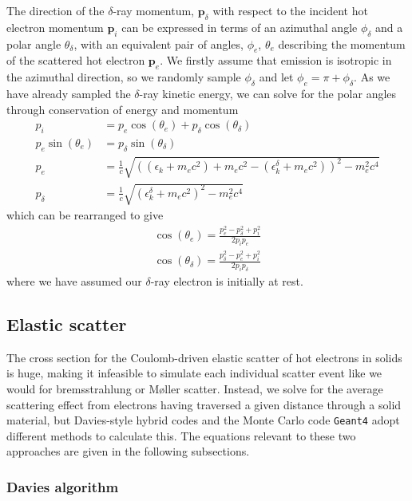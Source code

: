 \documentclass[12pt]{article}
\numberwithin{equation}{section}
\begin{document}
The direction of the $\delta$-ray momentum, $\textbf{p}_\delta$ with respect to the incident hot electron momentum $\textbf{p}_i$ can be expressed in terms of an azimuthal angle $\phi_\delta$ and a polar angle $\theta_\delta$, with an equivalent pair of angles, $\phi_e$, $\theta_e$ describing the momentum of the scattered hot electron $\textbf{p}_e$. We firstly assume that emission is isotropic in the azimuthal direction, so we randomly sample $\phi_\delta$ and let $\phi_e =\pi + \phi_\delta$. As we have already sampled the $\delta$-ray kinetic energy, we can solve for the polar angles through conservation of energy and momentum
%
\begin{align} \label{eq:moller_conservation}
  p_i &= p_e \cos(\theta_e) + p_\delta \cos(\theta_\delta) \\
  p_e \sin(\theta_e) &= p_\delta \sin(\theta_\delta) \\
  p_e &= \frac{1}{c} \sqrt{((\epsilon_k + m_ec^2) + m_ec^2 - (\epsilon_k^\delta + m_ec^2))^2 - m_e^2c^4} \\
  p_\delta &= \frac{1}{c}\sqrt{(\epsilon_k^\delta+m_ec^2)^2 - m_e^2c^4}
\end{align} 
%
which can be rearranged to give
%
\begin{align}
  \cos(\theta_e) = \frac{p_e^2 - p_\delta^2 + p_i^2}{2p_ip_e} \\
  \cos(\theta_\delta) = \frac{p_\delta^2 - p_e^2 + p_i^2}{2p_ip_\delta}
\end{align}
%
where we have assumed our $\delta$-ray electron is initially at rest.

\subsection{Elastic scatter} \label{sec:theory:elastic}

The cross section for the Coulomb-driven elastic scatter of hot electrons in solids is huge, making it infeasible to simulate each individual scatter event like we would for bremsstrahlung or M\o{}ller scatter. Instead, we solve for the average scattering effect from electrons having traversed a given distance through a solid material, but Davies-style hybrid codes \cite{hybrid:Davies:1997, hybrid:Davies:2002} and the Monte Carlo code \texttt{Geant4} adopt different methods to calculate this. The equations relevant to these two approaches are given in the following subsections.

\subsubsection{Davies algorithm} \label{sec:theory:elastic:Davies}
\end{document}
